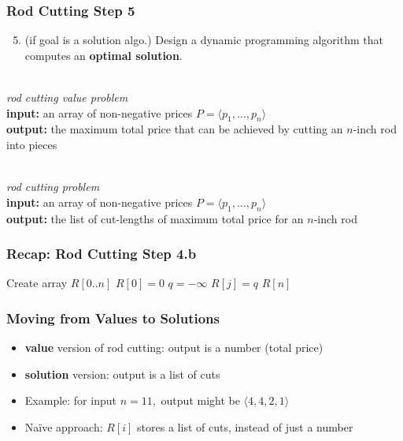 \documentclass[10pt,aspectratio=169]{beamer}
\newcommand{\stanza}{ \\~\ }
\begin{document}
\begin{frame} \frametitle{Rod Cutting Step 5}
  \begin{enumerate}
    \setcounter{enumi}{4}
    \item (if goal is a solution algo.) Design a dynamic programming algorithm that computes an \textbf{optimal solution}.
    \stanza
  \end{enumerate}

  
  \emph{rod cutting value problem} \\
  \textbf{input:} an array of non-negative prices $P=\langle p_1, \ldots, p_n \rangle$ \\
  \textbf{output:} the maximum total price that can be achieved by cutting an $n$-inch rod into pieces
  \stanza

  \emph{rod cutting problem} \\
  \textbf{input:} an array of non-negative prices $P=\langle p_1, \ldots, p_n \rangle$ \\
  \textbf{output:} the list of cut-lengths of maximum total price for an $n$-inch rod

\end{frame}

\begin{frame} \frametitle{Recap: Rod Cutting Step 4.b}
  {\small
  \begin{algorithmic}[1]
    \State Create array $R[0..n]$
    \State $R[0] = 0$
      \State $q=-\infty$
      \EndFor
      \State $R[j] = q$
    \EndFor
    \State \Return $R[n]$
    \EndFunction
  \end{algorithmic}
  }
\end{frame}

\begin{frame} \frametitle{Moving from Values to Solutions}
  \begin{itemize}
    \item \textbf{value} version of rod cutting: output is a number (total price)
    \item \textbf{solution} version: output is a list of cuts
    \item Example: for input $n=11,$ output might be $\langle 4, 4, 2, 1 \rangle$
    \item Na\"{i}ve approach: $R[i]$ stores a list of cuts, instead of just a number
  \end{itemize}
\end{frame}
\end{document}

